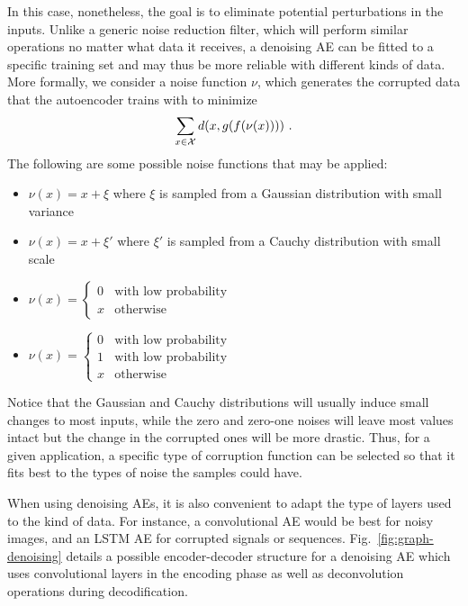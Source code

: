 In this case, nonetheless, the goal is to eliminate potential perturbations in the inputs. Unlike a generic noise reduction filter, which will perform similar operations no matter what data it receives, a denoising AE can be fitted to a specific training set and may thus be more reliable with different kinds of data. More formally, we consider a noise function $\nu$, which generates the corrupted data that the autoencoder trains with to minimize \[\sum_{x\in\mathcal X} d(x, g(f(\nu(x))))~.\] The following are some possible noise functions that may be applied:

\begin{itemize}
    \item $\nu(x)=x+\xi$ where $\xi$ is sampled from a Gaussian distribution with small variance
    \item $\nu(x)=x+\xi'$ where $\xi'$ is sampled from a Cauchy distribution with small scale
    \item $\nu(x)=\begin{cases}
        0&\mbox{with low probability}\\x&\mbox{otherwise}
    \end{cases}$
    \item $\nu(x)=\begin{cases}
        0&\mbox{with low probability}\\1&\mbox{with low probability}\\x&\mbox{otherwise}
    \end{cases}$
\end{itemize}

Notice that the Gaussian and Cauchy distributions will usually induce small changes to most inputs, while the zero and zero-one noises will leave most values intact but the change in the corrupted ones will be more drastic. Thus, for a given application, a specific type of corruption function can be selected so that it fits best to the types of noise the samples could have.

When using denoising AEs, it is also convenient to adapt the type of layers used to the kind of data. For instance, a convolutional AE would be best for noisy images, and an LSTM AE for corrupted signals or sequences. Fig.~\ref{fig:graph-denoising} details a possible encoder-decoder structure for a denoising AE which uses convolutional layers in the encoding phase as well as deconvolution operations during decodification.

